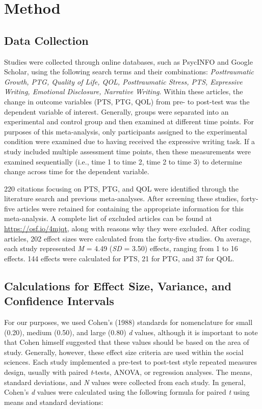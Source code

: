 \documentclass[english,man, mask]{apa6}
\theoremstyle{definition}
\theoremstyle{definition}
\theoremstyle{definition}
\theoremstyle{remark}
\begin{document}
\section{Method}\label{method}

\subsection{Data Collection}\label{data-collection}

Studies were collected through online databases, such as PsycINFO and
Google Scholar, using the following search terms and their combinations:
\emph{Posttraumatic Growth, PTG, Quality of Life, QOL, Posttraumatic
Stress, PTS, Expressive Writing, Emotional Disclosure, Narrative
Writing}. Within these articles, the change in outcome variables (PTS,
PTG, QOL) from pre- to post-test was the dependent variable of interest.
Generally, groups were separated into an experimental and control group
and then examined at different time points. For purposes of this
meta-analysis, only participants assigned to the experimental condition
were examined due to having received the expressive writing task. If a
study included multiple assessment time points, then these measurements
were examined sequentially (i.e., time 1 to time 2, time 2 to time 3) to
determine change across time for the dependent variable.

220 citations focusing on PTS, PTG, and QOL were identified through the
literature search and previous meta-analyses. After screening these
studies, forty-five articles were retained for containing the
appropriate information for this meta-analysis. A complete list of
excluded articles can be found at \url{https://osf.io/4mjqt}, along with
reasons why they were excluded. After coding articles, 202 effect sizes
were calculated from the forty-five studies. On average, each study
represented \emph{M} = 4.49 (\emph{SD} = 3.50) effects, ranging from 1
to 16 effects. 144 effects were calculated for PTS, 21 for PTG, and 37
for QOL.

\subsection{Calculations for Effect Size, Variance, and Confidence
Intervals}\label{calculations-for-effect-size-variance-and-confidence-intervals}

For our purposes, we used Cohen's (1988) standards for nomenclature for
small (0.20), medium (0.50), and large (0.80) \emph{d} values, although
it is important to note that Cohen himself suggested that these values
should be based on the area of study. Generally, however, these effect
size criteria are used within the social sciences. Each study
implemented a pre-test to post-test style repeated measures design,
usually with paired \emph{t}-tests, ANOVA, or regression analyses. The
means, standard deviations, and \emph{N} values were collected from each
study. In general, Cohen's \emph{d} values were calculated using the
following formula for paired \emph{t} using means and standard
deviations:
\end{document}
